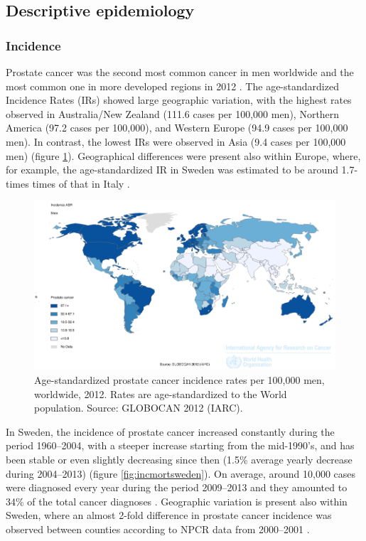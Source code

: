 \subsection{Descriptive epidemiology}
\label{section:descriptiveepidemiology}
\subsubsection{Incidence}
Prostate cancer was the second most common cancer in men worldwide and the most common one in more developed regions in 2012 \citep{ferlay_cancer_2015}. The age-standardized Incidence Rates (IRs) showed large geographic variation, with the highest rates observed in Australia/New Zealand (111.6 cases per 100,000 men), Northern America (97.2 cases per 100,000), and Western Europe (94.9 cases per 100,000 men). In contrast, the lowest IRs were observed in Asia (9.4 cases per 100,000 men) (figure \ref{fig:worldincpca}). Geographical differences were present also within Europe, where, for example, the age-standardized IR in Sweden was estimated to be around 1.7-times times of that in Italy \citep{ferlay_cancer_2015}.

\begin{figure}
\begin{center}
\includegraphics[width=\linewidth]{figures/incidencepca.png}
\end{center}
\caption[Age-standardized prostate cancer incidence rates per 100,000 men, worldwide, 2012]{Age-standardized prostate cancer incidence rates per 100,000 men, worldwide, 2012. Rates are age-standardized to the World population. Source: GLOBOCAN 2012 (IARC).}
\label{fig:worldincpca}
\end{figure}

In Sweden, the incidence of prostate cancer increased constantly during the period 1960--2004, with a steeper increase starting from the mid-1990's, and has been stable or even slightly decreasing since then (1.5\% average yearly decrease during 2004--2013) (figure \ref{fig:incmortsweden}). On average, around 10,000 cases were diagnosed every year during the period 2009--2013 and they amounted to 34\% of the total cancer diagnoses \citep{engholm_nordcan_2015}. Geographic variation is present also within Sweden, where an almost 2-fold difference in prostate cancer incidence was observed between counties according to NPCR data from 2000--2001 \citep{stattin_geographical_2005}.

